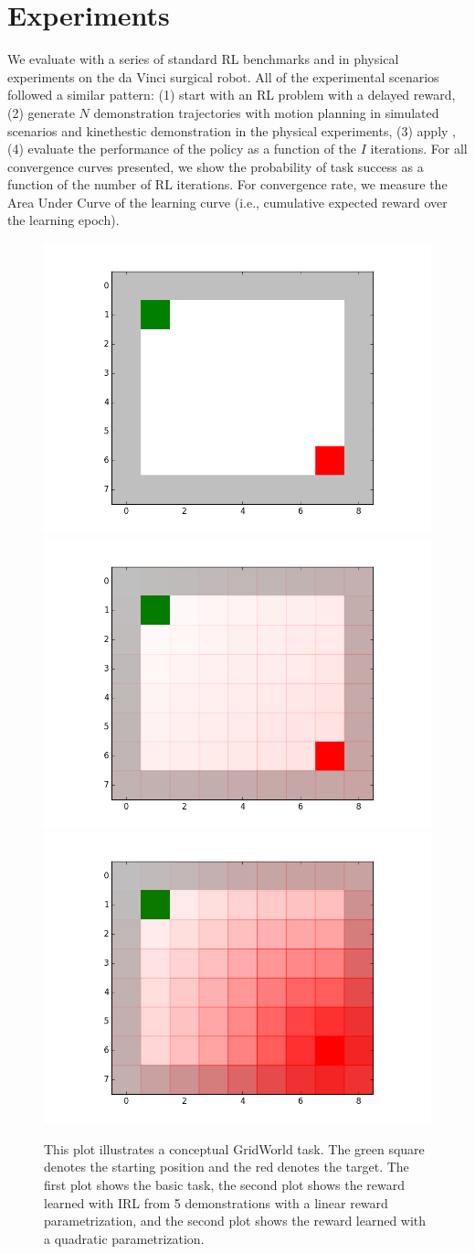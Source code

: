 %

\section{Experiments}\label{sec:exp}
We evaluate \hirl with a series of standard RL benchmarks and in  physical experiments on the da Vinci surgical robot.
All of the experimental scenarios followed a similar pattern: (1) start with an RL problem with a delayed reward, (2) generate $N$ demonstration trajectories with motion planning in simulated scenarios and kinethestic demonstration in the physical experiments, (3) apply \hirl, (4) evaluate the performance of the policy as a function of the $I$ iterations.
For all convergence curves presented, we show the probability of task success as a function of the number of RL iterations.
For convergence rate, we measure the Area Under Curve of the learning curve (i.e., cumulative expected reward over the learning epoch).

\begin{figure}[t]
\centering
 \includegraphics[width=0.32\columnwidth]{concept/swirl1-rewards.png}
  \includegraphics[width=0.32\columnwidth]{concept/swirl1-linear.png}
   \includegraphics[width=0.32\columnwidth]{concept/swirl1-quadratic.png}
 \caption{This plot illustrates a conceptual GridWorld task. The green square denotes the starting position and the red denotes the target. The first plot shows the basic task, the second plot shows the reward learned with IRL from 5 demonstrations with a linear reward parametrization, and the second plot shows the reward learned with a quadratic parametrization. \label{concept:1}}
\end{figure}

